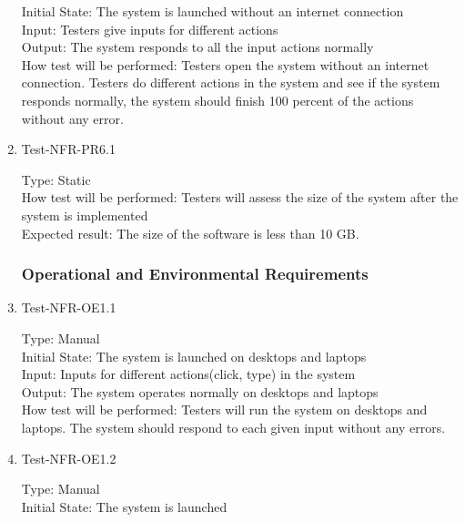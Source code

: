 \documentclass[12pt, titlepage]{article}
\begin{document}
\begin{enumerate}
Initial State: The system is launched without an internet connection\\

Input: Testers give inputs for different actions\\

Output: The system responds to all the input actions normally\\

How test will be performed: Testers open the system without an internet connection. Testers do different actions in the system and see if the system responds normally, the system should finish 100 percent of the actions without any error.


\item{Test-NFR-PR6.1\\}

Type: Static\\

How test will be performed: Testers will assess the size of the system after the system is implemented\\

Expected result: The size of the software is less than 10 GB.

\subsubsection{Operational and Environmental Requirements}
\item{Test-NFR-OE1.1\\}

Type: Manual\\

Initial State: The system is launched on desktops and laptops\\

Input: Inputs for different actions(click, type) in the system\\

Output: The system operates normally on desktops and laptops\\

How test will be performed: Testers will run the system on desktops and laptops. The system should respond to each given input without any errors.

\item{Test-NFR-OE1.2\\}

Type: Manual\\

Initial State: The system is launched\\


\end{enumerate}
\end{document}
